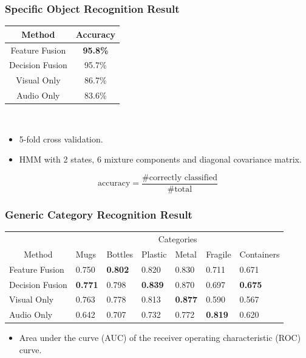\documentclass[t]{beamer}
\begin{document}
\begin{frame}
  \frametitle{Specific Object Recognition Result}

  \centering
  \begin{tabular}[h!]{c|c}
    \hline
    Method & Accuracy \\ \hline \hline
    Feature Fusion & \textbf{95.8\%} \\
    Decision Fusion  & 95.7\% \\
    Visual Only & 86.7\% \\
    Audio Only & 83.6\% \\
    \hline
  \end{tabular}

  ~
  \begin{itemize}
    \item 5-fold cross validation.
    \item HMM with 2 states, 6 mixture components and diagonal covariance matrix.
  \end{itemize}
  \vfill
  {\scriptsize
    \[ \text{accuracy} =  \frac{\text{\# correctly classified}}{\text{\# total}} \]
  }
\end{frame}

\iffalse
\begin{frame}
  \frametitle{Generic Category Recognition Result}
  \centering
  \begin{tabular}[h]{l*{5}{p{.07\linewidth}}p{.11\linewidth}}
    \toprule
    & \multicolumn{6}{c}{Categories} \tabularnewline \cmidrule(r){2-7}
    \multicolumn{1}{c}{Method} & Mugs & Bottles & Plastic & Metal & Fragile & Containers \tabularnewline \midrule
    Feature Fusion & 0.750 & \textbf{0.802} & 0.820 & 0.830 & 0.711 & 0.671 \tabularnewline
    Decision Fusion & \textbf{0.771} & 0.798 & \textbf{0.839} & 0.870 & 0.697 & \textbf{0.675} \tabularnewline
    Visual Only & 0.763 & 0.778 & 0.813 & \textbf{0.877} & 0.590 & 0.567 \tabularnewline
    Audio Only & 0.642 & 0.707 & 0.732 & 0.772 & \textbf{0.819} & 0.620 \tabularnewline
    \bottomrule
  \end{tabular}
  \begin{itemize}
    \item Area under the curve (AUC) of the receiver operating characteristic (ROC) curve.
  \end{itemize}
\end{frame}
\end{document}

